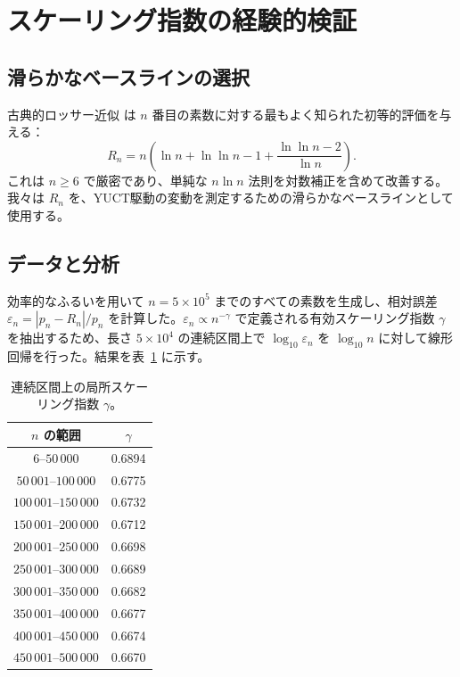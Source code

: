 \documentclass[11pt,a4paper]{article}
\begin{document}
	\section{スケーリング指数の経験的検証}
	\subsection{滑らかなベースラインの選択}
	古典的ロッサー近似 \cite{Rosser1941} は \(n\) 番目の素数に対する最もよく知られた初等的評価を与える：
	\begin{equation}\label{eq:rosser}
		R_n = n\!\left(\ln n + \ln\ln n - 1 + \frac{\ln\ln n - 2}{\ln n}\right).
	\end{equation}
	これは \(n \ge 6\) で厳密であり、単純な \(n\ln n\) 法則を対数補正を含めて改善する。我々は \(R_n\) を、YUCT駆動の変動を測定するための滑らかなベースラインとして使用する。
	
	\subsection{データと分析}
	効率的なふるいを用いて \(n = 5\times10^5\) までのすべての素数を生成し、相対誤差 \(\varepsilon_n = |p_n - R_n|/p_n\) を計算した。\(\varepsilon_n \propto n^{-\gamma}\) で定義される有効スケーリング指数 \(\gamma\) を抽出するため、長さ \(5\times10^4\) の連続区間上で \(\log_{10}\varepsilon_n\) を \(\log_{10}n\) に対して線形回帰を行った。結果を表~\ref{tab:gamma} に示す。
	
	\begin{table}[htbp]
		\centering
		\caption{連続区間上の局所スケーリング指数 \(\gamma\)。}
		\label{tab:gamma}
		\small
		\begin{tabular}{c c}
			\toprule
			\(n\) の範囲 & \(\gamma\) \\
			\midrule
			\(6\)--\(50\,000\)    & 0.6894 \\
			\(50\,001\)--\(100\,000\) & 0.6775 \\
			\(100\,001\)--\(150\,000\)& 0.6732 \\
			\(150\,001\)--\(200\,000\)& 0.6712 \\
			\(200\,001\)--\(250\,000\)& 0.6698 \\
			\(250\,001\)--\(300\,000\)& 0.6689 \\
			\(300\,001\)--\(350\,000\)& 0.6682 \\
			\(350\,001\)--\(400\,000\)& 0.6677 \\
			\(400\,001\)--\(450\,000\)& 0.6674 \\
			\(450\,001\)--\(500\,000\)& 0.6670 \\
			\bottomrule
		\end{tabular}
	\end{table}
	
\end{document}
